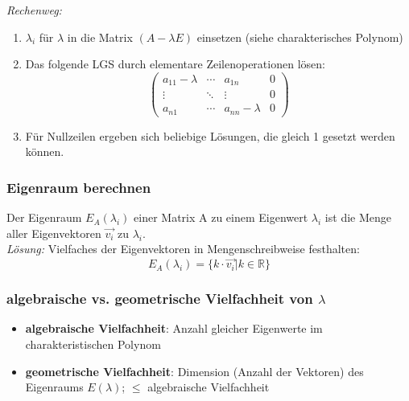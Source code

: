 \textit{Rechenweg:}

\begin{enumerate}
    \item \(\lambda_i\) für \(\lambda\) in die Matrix \((A-\lambda E)\) einsetzen (siehe charakterisches Polynom)
    \item Das folgende LGS durch elementare Zeilenoperationen lösen:\\
        \begin{equation*}
            \left( 
            \begin{array}{ccc|c}
                a_{11} - \lambda & \cdots & a_{1n} & 0\\
                \vdots & \ddots & \vdots & 0\\
                a_{n1} & \cdots & a_{nn} - \lambda & 0
            \end{array}
            \right)
        \end{equation*}
    \item Für Nullzeilen ergeben sich beliebige Lösungen, die gleich 1 gesetzt werden können.
\end{enumerate}


\subsubsection{Eigenraum berechnen}

Der Eigenraum \(E_A(\lambda_i)\) einer Matrix A zu einem Eigenwert \(\lambda_i\) ist die Menge aller Eigenvektoren \(\vec{v_i}\) zu \(\lambda_i\).\\

\textit{Lösung:}
Vielfaches der Eigenvektoren in Mengenschreibweise festhalten:\\

\begin{equation*}
    E_A(\lambda_i) = \{ k \cdot \vec{v_i} | k \in \mathbb{R} \}   
\end{equation*}

\subsubsection{algebraische vs. geometrische Vielfachheit von \(\lambda\)}
\begin{itemize}
    \item \textbf{algebraische Vielfachheit}: Anzahl gleicher Eigenwerte im charakteristischen Polynom
    \item \textbf{geometrische Vielfachheit}: Dimension (Anzahl der Vektoren) des Eigenraums \(E(\lambda)\); \(\leq\) algebraische Vielfachheit
\end{itemize}